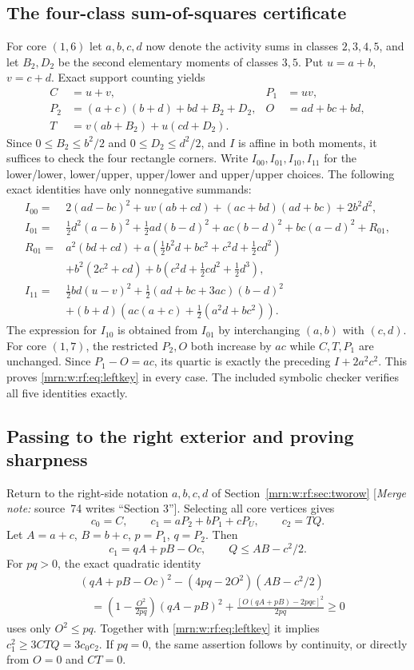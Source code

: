 \documentclass[11pt,a4paper]{article}
\theoremstyle{remark}\newtheorem{remark}[theorem]{Remark}
\newcommand{\mnote}[1]{[\textit{Merge note:} #1]}
\begin{document}
\subsection{The four-class sum-of-squares certificate}
For core $(1,6)$ let $a,b,c,d$ now denote the activity sums in classes $2,3,4,5$, and let $B_2,D_2$ be the second elementary moments of classes $3,5$. Put $u=a+b$, $v=c+d$. Exact support counting yields
\begin{align*}
 C&=u+v,& P_1&=uv,\\
 P_2&=(a+c)(b+d)+bd+B_2+D_2,& O&=ad+bc+bd,\\
 T&=v(ab+B_2)+u(cd+D_2).
\end{align*}
Since $0\le B_2\le b^2/2$ and $0\le D_2\le d^2/2$, and $I$ is affine in both moments, it suffices to check the four rectangle corners. Write $I_{00},I_{01},I_{10},I_{11}$ for the lower/lower, lower/upper, upper/lower and upper/upper choices. The following exact identities have only nonnegative summands:
\begin{align*}
 I_{00}={}&2(ad-bc)^2+uv(ab+cd)+(ac+bd)(ad+bc)+2b^2d^2,\\
 I_{01}={}&\tfrac12d^2(a-b)^2+\tfrac12ad(b-d)^2
          +ac(b-d)^2+bc(a-d)^2+R_{01},\\
 R_{01}={}&a^2(bd+cd)
 +a\left(\tfrac12b^2d+bc^2+c^2d+\tfrac12cd^2\right)\\
 &+b^2(2c^2+cd)+b\left(c^2d+\tfrac12cd^2+\tfrac12d^3\right),\\
 I_{11}={}&\tfrac12bd(u-v)^2+\tfrac12(ad+bc+3ac)(b-d)^2\\
 &+(b+d)\left(ac(a+c)+\tfrac12(a^2d+bc^2)\right).
\end{align*}
The expression for $I_{10}$ is obtained from $I_{01}$ by interchanging $(a,b)$ with $(c,d)$. For core $(1,7)$, the restricted $P_2,O$ both increase by $ac$ while $C,T,P_1$ are unchanged. Since $P_1-O=ac$, its quartic is exactly the preceding $I+2a^2c^2$. This proves \eqref{mrn:w:rf:eq:leftkey} in every case. The included symbolic checker verifies all five identities exactly.

\subsection{Passing to the right exterior and proving sharpness}
Return to the right-side notation $a,b,c,d$ of Section~\ref{mrn:w:rf:sec:tworow} \mnote{source~74 writes ``Section 3''}. Selecting all core vertices gives
\[
 c_0=C,\qquad c_1=aP_2+bP_1+cP_U,\qquad c_2=TQ.
\]
Let $A=a+c$, $B=b+c$, $p=P_1$, $q=P_2$. Then
\[
 c_1=qA+pB-Oc,\qquad Q\le AB-c^2/2.
\]
For $pq>0$, the exact quadratic identity
\begin{align*}
 &(qA+pB-Oc)^2-(4pq-2O^2)(AB-c^2/2)\\
 &\quad=\left(1-\frac{O^2}{2pq}\right)(qA-pB)^2
 +\frac{[O(qA+pB)-2pqc]^2}{2pq}\ge0
\end{align*}
uses only $O^2\le pq$. Together with \eqref{mrn:w:rf:eq:leftkey} it implies $c_1^2\ge3CTQ=3c_0c_2$. If $pq=0$, the same assertion follows by continuity, or directly from $O=0$ and $CT=0$.
\end{document}
